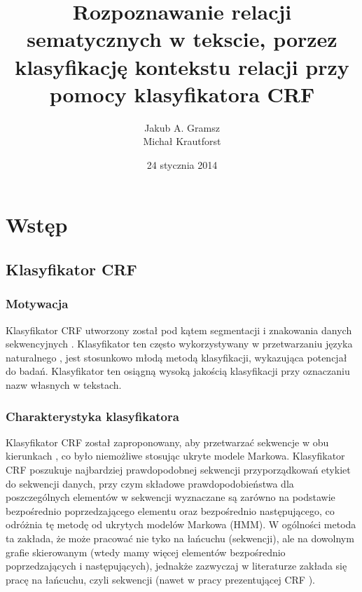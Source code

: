 \documentclass[a4paper,10pt]{report}
\title{Rozpoznawanie relacji sematycznych w tekscie, porzez klasyfikację kontekstu relacji przy pomocy klasyfikatora \textbf{CRF}}
\author{Jakub A. Gramsz \\ Michał Krautforst}
\date{24 stycznia 2014}
\begin{document}
\renewcommand{\figurename}{Wykres}
\renewcommand{\chaptername}{}

\maketitle
\tableofcontents

\chapter{Wstęp} %

\section{Klasyfikator CRF} 

\subsection{Motywacja}

Klasyfikator CRF utworzony został pod kątem segmentacji i znakowania danych sekwencyjnych \cite{lafferty2001crf}. Klasyfikator ten często wykorzystywany w przetwarzaniu języka naturalnego \cite{culotta2006integrating,shen2007doccum} , jest stosunkowo młodą metodą klasyfikacji, wykazująca potencjał do badań. Klasyfikator ten osiągną wysoką jakością klasyfikacji przy oznaczaniu nazw własnych w tekstach.

\subsection{Charakterystyka klasyfikatora}

Klasyfikator CRF został zaproponowany, aby przetwarzać sekwencje w obu kierunkach \cite{lafferty2001crf}, co było niemożliwe stosując ukryte modele Markowa. Klasyfikator CRF poszukuje najbardziej prawdopodobnej sekwencji przyporządkowań etykiet do sekwencji danych, przy czym składowe prawdopodobieństwa dla poszczególnych elementów w sekwencji wyznaczane są zarówno na podstawie bezpośrednio poprzedzającego elementu oraz bezpośrednio następującego, co odróżnia tę metodę od ukrytych modelów Markowa (HMM). W ogólności metoda ta zakłada, że może pracować nie tyko na łańcuchu (sekwencji), ale na dowolnym grafie skierowanym (wtedy mamy więcej elementów bezpośrednio poprzedzających i następujących), jednakże zazwyczaj w literaturze zakłada się pracę na łańcuchu, czyli sekwencji (nawet w pracy prezentującej CRF \cite{lafferty2001crf}).
\end{document}
